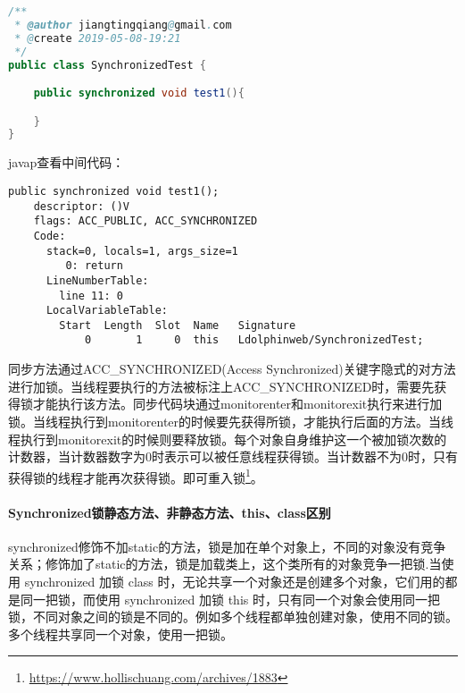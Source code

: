 \documentclass[../../../interview-questions.tex]{subfiles}
\begin{document}
\begin{lstlisting}[language=Java]
/**
 * @author jiangtingqiang@gmail.com
 * @create 2019-05-08-19:21
 */
public class SynchronizedTest {

    public synchronized void test1(){

    }
}
\end{lstlisting}

javap查看中间代码：

\begin{lstlisting}
public synchronized void test1();
    descriptor: ()V
    flags: ACC_PUBLIC, ACC_SYNCHRONIZED
    Code:
      stack=0, locals=1, args_size=1
         0: return
      LineNumberTable:
        line 11: 0
      LocalVariableTable:
        Start  Length  Slot  Name   Signature
            0       1     0  this   Ldolphinweb/SynchronizedTest;
\end{lstlisting}

同步方法通过ACC\_SYNCHRONIZED(Access Synchronized)关键字隐式的对方法进行加锁。当线程要执行的方法被标注上ACC\_SYNCHRONIZED时，需要先获得锁才能执行该方法。同步代码块通过monitorenter和monitorexit执行来进行加锁。当线程执行到monitorenter的时候要先获得所锁，才能执行后面的方法。当线程执行到monitorexit的时候则要释放锁。每个对象自身维护这一个被加锁次数的计数器，当计数器数字为0时表示可以被任意线程获得锁。当计数器不为0时，只有获得锁的线程才能再次获得锁。即可重入锁\footnote{\url{https://www.hollischuang.com/archives/1883}}。

\paragraph{Synchronized锁静态方法、非静态方法、this、class区别}

synchronized修饰不加static的方法，锁是加在单个对象上，不同的对象没有竞争关系；修饰加了static的方法，锁是加载类上，这个类所有的对象竞争一把锁.当使用 synchronized 加锁 class 时，无论共享一个对象还是创建多个对象，它们用的都是同一把锁，而使用 synchronized 加锁 this 时，只有同一个对象会使用同一把锁，不同对象之间的锁是不同的。例如多个线程都单独创建对象，使用不同的锁。多个线程共享同一个对象，使用一把锁。
\end{document}
